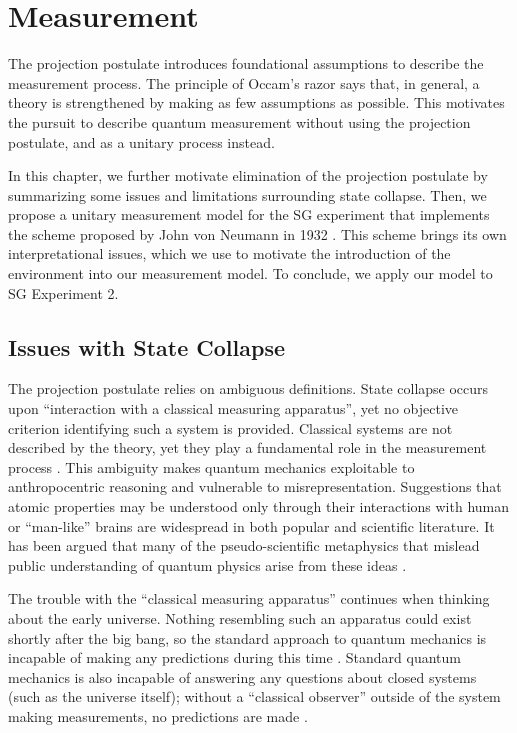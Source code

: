 \chapter{Measurement} \label{Chapter 4}

The projection postulate introduces foundational assumptions to describe the measurement process. The principle of Occam's razor says that, in general, a theory is strengthened by making as few assumptions as possible. This motivates the pursuit to describe quantum measurement without using the projection postulate, and as a unitary process instead.

In this chapter, we further motivate elimination of the projection postulate by summarizing some issues and limitations surrounding state collapse. Then, we propose a unitary measurement model for the SG experiment that implements the scheme proposed by John von Neumann in 1932 \cite{Neumann}. This scheme brings its own interpretational issues, which we use to motivate the introduction of the environment into our measurement model. To conclude, we apply our model to SG Experiment 2.

\section{Issues with State Collapse}
The projection postulate relies on ambiguous definitions. State collapse occurs upon ``interaction with a classical measuring apparatus'', yet no objective criterion identifying such a system is provided. Classical systems are not described by the theory, yet they play a fundamental role in the measurement process \cite{landau}. This ambiguity makes quantum mechanics exploitable to anthropocentric reasoning and vulnerable to misrepresentation. Suggestions that atomic properties may be understood only through their interactions with human or ``man-like'' brains are widespread in both popular \cite{Capra} and scientific \cite{stapp} literature. It has been argued that many of the pseudo-scientific metaphysics that mislead public understanding of quantum physics arise from these ideas \cite{stenger}.

The trouble with the ``classical measuring apparatus'' continues when thinking about the early universe. Nothing resembling such an apparatus could exist shortly after the big bang, so the standard approach to quantum mechanics is incapable of making any predictions during this time \cite{Craig}. Standard quantum mechanics is also incapable of answering any questions about closed systems (such as the universe itself); without a ``classical observer'' outside of the system making measurements, no predictions are made \cite{Craig}.

